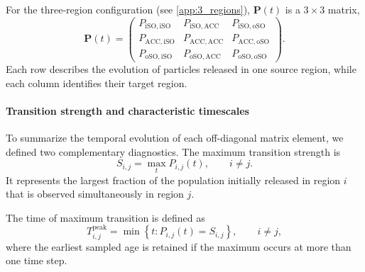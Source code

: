 \documentclass[
  draft
]{agujournal2025}
\begin{document}
            For the three-region configuration (see \ref{app:3_regions}), $\mathbf{P}(t)$ is a $3\times3$ matrix,
            \begin{equation}
                \mathbf{P}(t) =
                \begin{pmatrix}
                    P_{\mathrm{iSO},\mathrm{iSO}} &
                    P_{\mathrm{iSO},\mathrm{ACC}} &
                    P_{\mathrm{iSO},\mathrm{oSO}}
                    \\
                    P_{\mathrm{ACC},\mathrm{iSO}} &
                    P_{\mathrm{ACC},\mathrm{ACC}} &
                    P_{\mathrm{ACC},\mathrm{oSO}}
                    \\
                    P_{\mathrm{oSO},\mathrm{iSO}} &
                    P_{\mathrm{oSO},\mathrm{ACC}} &
                    P_{\mathrm{oSO},\mathrm{oSO}}
                \end{pmatrix}.
                \label{eq:three_region_transition_matrix}
            \end{equation}
            Each row describes the evolution of particles released in one source region, while each column identifies their target region.

            \paragraph{Transition strength and characteristic timescales}
                To summarize the temporal evolution of each off-diagonal matrix element, we defined two complementary diagnostics. The maximum transition strength is
                \begin{equation}
                    S_{i,j} = \max_t P_{i,j}(t), \qquad i\neq j.
                    \label{eq:transition_strength}
                \end{equation}
                It represents the largest fraction of the population initially released in region $i$ that is observed simultaneously in region $j$.
                
                The time of maximum transition is defined as
                \begin{equation}
                    T_{i,j}^{\mathrm{peak}} = \min \left\{t: P_{i,j}(t)=S_{i,j} \right\}, \qquad i\neq j,
                    \label{eq:transition_peak_time}
                \end{equation}
                where the earliest sampled age is retained if the maximum occurs at more than one time step.
                
\end{document}
